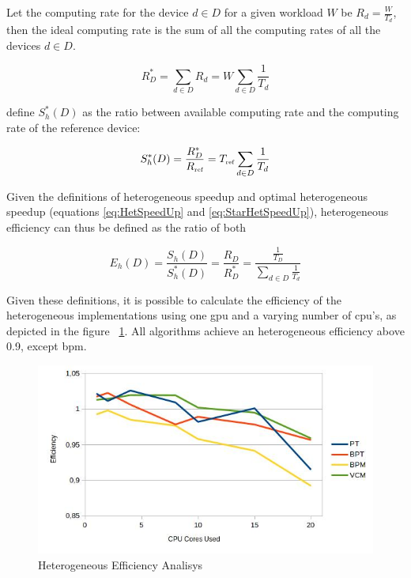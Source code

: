 Let the computing rate for the device $d \in D$ for a given workload $W$ be $R_d = \frac{W}{T_d}$, then the ideal computing rate is the sum of all the computing rates of all the devices $d \in D$.

\begin{equation}
R^*_D = \sum_{d \in D} R_d = W \sum_{d \in D} \frac{1}{T_d}
\label{eq:StarCapacity}
\end{equation}

\cite{Chamberlain98} define $S_h^*(D)$ as the ratio between available computing rate and the computing rate of the reference device:

\begin{equation}
S^*_h(D) = \frac{R^*_D}{R_{\mbox{\tiny ref}}} = T_{\mbox{\tiny ref}} \sum_{d \in D} \frac{1}{T_d}
\label{eq:StarHetSpeedUp}
\end{equation}

Given the definitions of heterogeneous speedup and optimal heterogeneous speedup (equations \ref{eq:HetSpeedUp} and \ref{eq:StarHetSpeedUp}), heterogeneous efficiency can thus be defined as the ratio of both

\begin{equation}
E_h(D) = \frac{S_h(D)}{S_h^*(D)} = \frac{R_D}{R^*_D} = \frac{\frac{1}{T_D}}{\sum_{d \in D} \frac{1}{T_d}}
\label{eq:HetEff}
\end{equation}

Given these definitions, it is possible to calculate the efficiency of the heterogeneous implementations using one \gls{gpu} and a varying number of \gls{cpu}'s, as depicted in the figure ~\ref{img:hefficiency}. All algorithms achieve an heterogeneous efficiency above 0.9, except \gls{bpm}.

\begin{figure}[H]
\centering
\includegraphics[width=\linewidth]{img/hefficiency.jpg}
\caption{\label{img:hefficiency} Heterogeneous Efficiency Analisys}
\end{figure}


